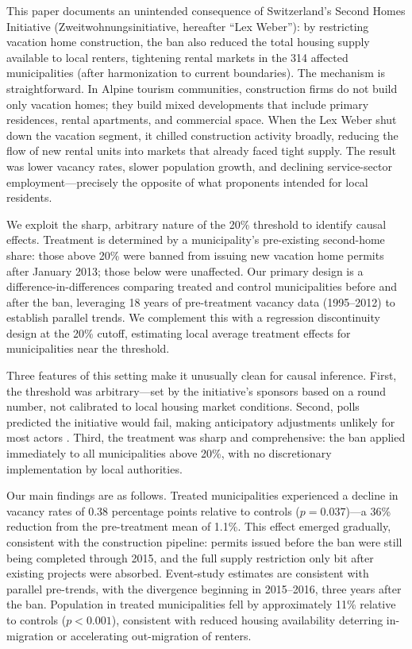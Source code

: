 \documentclass[12pt]{article}
\begin{document}
This paper documents an unintended consequence of Switzerland's Second Homes Initiative (Zweitwohnungsinitiative, hereafter ``Lex Weber''): by restricting vacation home construction, the ban also reduced the total housing supply available to local renters, tightening rental markets in the 314 affected municipalities (after harmonization to current boundaries). The mechanism is straightforward. In Alpine tourism communities, construction firms do not build only vacation homes; they build mixed developments that include primary residences, rental apartments, and commercial space. When the Lex Weber shut down the vacation segment, it chilled construction activity broadly, reducing the flow of new rental units into markets that already faced tight supply. The result was lower vacancy rates, slower population growth, and declining service-sector employment---precisely the opposite of what proponents intended for local residents.

We exploit the sharp, arbitrary nature of the 20\% threshold to identify causal effects. Treatment is determined by a municipality's pre-existing second-home share: those above 20\% were banned from issuing new vacation home permits after January 2013; those below were unaffected. Our primary design is a difference-in-differences comparing treated and control municipalities before and after the ban, leveraging 18 years of pre-treatment vacancy data (1995--2012) to establish parallel trends. We complement this with a regression discontinuity design at the 20\% cutoff, estimating local average treatment effects for municipalities near the threshold.

Three features of this setting make it unusually clean for causal inference. First, the threshold was arbitrary---set by the initiative's sponsors based on a round number, not calibrated to local housing market conditions. Second, polls predicted the initiative would fail, making anticipatory adjustments unlikely for most actors \citep{hilber2020economic}. Third, the treatment was sharp and comprehensive: the ban applied immediately to all municipalities above 20\%, with no discretionary implementation by local authorities.

Our main findings are as follows. Treated municipalities experienced a decline in vacancy rates of 0.38 percentage points relative to controls ($p = 0.037$)---a 36\% reduction from the pre-treatment mean of 1.1\%. This effect emerged gradually, consistent with the construction pipeline: permits issued before the ban were still being completed through 2015, and the full supply restriction only bit after existing projects were absorbed. Event-study estimates are consistent with parallel pre-trends, with the divergence beginning in 2015--2016, three years after the ban. Population in treated municipalities fell by approximately 11\% relative to controls ($p < 0.001$), consistent with reduced housing availability deterring in-migration or accelerating out-migration of renters.
\end{document}
